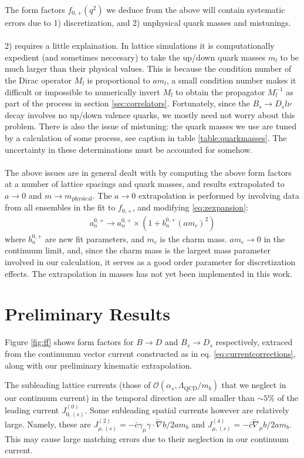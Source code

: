\documentclass[a4paper,10pt]{article}
\numberwithin{equation}{section}
\begin{document}
The form factors $f_{0,+}(q^2)$ we deduce from the above will contain systematic errors due to 1) discretization, and 2) unphysical quark masses and mistunings. 
\\ \\
2) requires a little explaination. In lattice simulations it is computationally expedient (and sometimes neccesary) to take the up/down quark masses $m_l$ to be much larger than their physical values. This is because the condition number of the Dirac operator $M_l$ is proportional to $am_l$, a small condition number makes it difficult or impossible to numerically invert $M_l$ to obtain the propagator $M^{-1}_l$ as part of the process in section \ref{sec:correlators}. Fortunately, since the $B_s\to D_s l\nu$ decay involves no up/down valence quarks, we mostly need not worry about this problem. There is also the issue of mistuning: the quark masses we use are tuned by a calculation of some process, see caption in table \ref{table:quarkmasses}. The uncertainty in these determinations must be accounted for somehow.
\\ \\
The above issues are in general dealt with by computing the above form factors at a number of lattice spacings and quark masses, and results extrapolated to $a\to 0$ and $m\to m_{\text{physical}}$. The $a\to 0$ extrapolation is performed by involving data from all ensembles in the fit to $f_{0,+}$, and modifying \eqref{eq:zexpansion}:
\begin{align}
	a^{0,+}_n \to a^{0,+}_n \times ( 1 + b^{0,+}_n (am_c)^2 )
\end{align}
where $b^{0,+}_n$ are new fit parameters, and $m_c$ is the charm mass. $am_c\to0$ in the continuum limit, and, since the charm mass is the largest mass parameter involved in our calculation, it serves as a good order parameter for discretization effects. The extrapolation in masses has not yet been implemented in this work.
\section{Preliminary Results}
\label{sec:results}

Figure \ref{fig:ff} shows form factors for $B\to D$ and $B_s \to D_s$ respectively, extraced from the continuunm vector current constructed as in eq. \eqref{eq:currentcorrections}, along with our preliminary kinematic extrapolation.

The subleading lattice currents (those of $\mathcal{O}(\alpha_s,\Lambda_{\mathrm{QCD}}/m_b)$ that we neglect in our continuum current) in the temporal direction are all smaller than $\sim 5\%$ of the leading current $J^{(0)}_{0,{(s)}}$. Some subleading spatial currents however are relatively large. Namely, these are $J^{(2)}_{\mu,(s)} = - \bar{c}\gamma_\mu \gamma \cdot\overleftarrow{\nabla} b/2am_b$ and $J^{(4)}_{\mu,(s)} = - \bar{c} \overleftarrow{\nabla}_{\mu} b/2am_b$. This may cause large matching errors due to their neglection in our continuum current.
\end{document}
